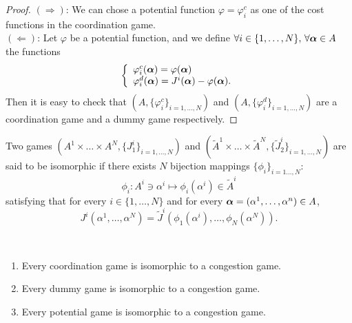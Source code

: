 \begin{proof}
	
	$(\Rightarrow)$: We can chose a potential function $\varphi = \varphi_i^c$ as one of the cost functions in the coordination game.\\	
	$(\Leftarrow)$: Let $\varphi$ be a potential function, and we define $\forall i \in \{1,\ldots, N\}, \,  \forall \boldsymbol{\alpha} \in A$ the functions
	$$
		\left\{
			\begin{array}{l}
				\varphi_i^c(\boldsymbol{\alpha}) = \varphi(\boldsymbol{\alpha}) \\
				\varphi_i^{d}(\boldsymbol{\alpha}) = J^i(\boldsymbol{\alpha}) - \varphi(\boldsymbol{\alpha}).
			\end{array}
		\right.
	$$
	Then it is easy to check that $(A, \{\varphi_i^c\}_{i=1,\ldots,N})$ and $(A, \{\varphi_i^d\}_{i=1,\ldots, N})$ are a coordination game and a dummy game respectively.
\end{proof}




\begin{definition}
	Two games $(A^1 \times \ldots \times A^N, \{J^i_1 \}_{i=1,\ldots,N})$ and $(\tilde{A}^1 \times \ldots \times \tilde{A}^N, \{\tilde{J}^i_2\}_{i=1,\ldots,N})$ are said to be isomorphic if there exists $N$ bijection mappings $\{\phi_i\}_{i=1\ldots,N}$:
	$$	
		\phi_i : A^i \ni \alpha^i \mapsto \phi_i(\alpha^i) \in \tilde{A}^i
	$$
	satisfying that for every $i \in \{1,\ldots, N\}$ and for every $\boldsymbol{\alpha} = (\alpha^1,\ldots, \alpha^n) \in A$,
	$$
		J^i(\alpha^1, \ldots, \alpha^N) = \tilde{J}^i(\phi_1(\alpha^i), \ldots, \phi_N(\alpha^N) ).
	$$
\end{definition}


\begin{proposition}
	\ 
	\begin{enumerate}
		\item Every coordination game is isomorphic to a congestion game.
		\item Every dummy game is isomorphic to a congestion game.
		\item Every potential game is isomorphic to a congestion game.
	\end{enumerate}
\end{proposition}


